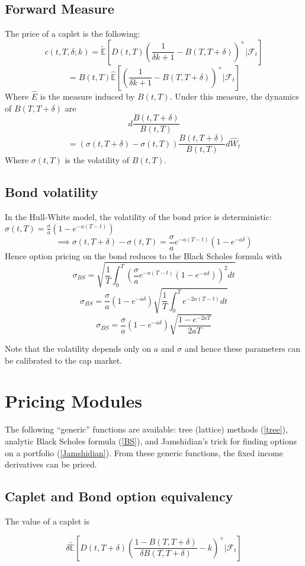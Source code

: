 \documentclass{article}
\theoremstyle{definition}
\begin{document}
\subsection{Forward Measure}
The price of a caplet is the following:
\[c(t, T, \delta; k)=\mathbb{\tilde{E}}\left[D(t, T)\left(\frac{1}{\delta k+1}-B(T, T+\delta)\right)^+ |\mathcal{F}_t\right]\]
\[=B(t, T)\mathbb{\hat{E}}\left[\left(\frac{1}{\delta k+1}-B(T, T+\delta)\right)^+ |\mathcal{F}_t\right]\]
Where \(\hat{E}\) is the measure induced by \(B(t, T)\).  Under this measure, the dynamics of \(B(T, T+\delta)\) are 
\[d\frac{B(t, T+\delta)}{B(t, T)}\]
\[=\left(\sigma(t, T+\delta)-\sigma(t, T)\right) \frac{B(t, T+\delta)}{B(t, T)}d\hat{W}_t\]
Where \(\sigma(t, T)\) is the volatility of \(B(t, T)\).

\subsection{Bond volatility} \label{bondvolatility}
In the Hull-White model, the volatility of the bond price is deterministic: \(\sigma(t, T)=\frac{\sigma}{a}(1-e^{-a(T-t)})\)
\[\implies \sigma(t, T+\delta)-\sigma(t, T)=\frac{\sigma}{a}e^{-a(T-t)}\left(1-e^{-a\delta}\right)\]
Hence option pricing on the bond reduces to the Black Scholes formula with \[\sigma_{BS}=\sqrt{\frac{1}{T} \int_0 ^ T \left(\frac{\sigma}{a}e^{-a(T-t)}\left(1-e^{-a\delta}\right)\right)^2 dt}\]
\[\sigma_{BS}=\frac{\sigma}{a}\left(1-e^{-a\delta}\right)\sqrt{\frac{1}{T} \int_0 ^ T e^{-2a(T-t)} dt}\]
\[\sigma_{BS}=\frac{\sigma}{a}\left(1-e^{-a\delta}\right)\sqrt{\frac{1-e^{-2aT}}{2aT}}\]

Note that the volatility depends only on \(a\) and \(\sigma\) and hence these parameters can be calibrated to the cap market. 

\section{Pricing Modules}
The following ``generic'' functions are available: tree (lattice) methods (\ref{tree}), analytic Black Scholes formula (\ref{BS}), and Jamshidian's trick for finding options on a portfolio (\ref{Jamshidian}). From these generic functions, the fixed income derivatives can be priced. 
\subsection{Caplet and Bond option equivalency}
 The value of a caplet is 
  
\[\delta\mathbb{\tilde{E}}\left[D(t, T+\delta)\left(\frac{1-B(T, T+\delta)}{\delta B(T, T+\delta)}-k\right)^+ |\mathcal{F}_t\right]\]
\end{document}
